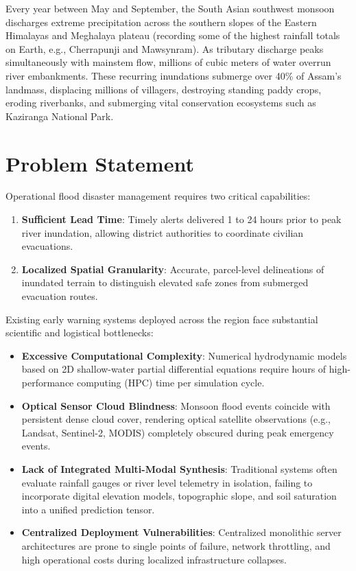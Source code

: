 \documentclass[12pt,a4paper,oneside]{report}
\begin{document}
Every year between May and September, the South Asian southwest monsoon discharges extreme precipitation across the southern slopes of the Eastern Himalayas and Meghalaya plateau (recording some of the highest rainfall totals on Earth, e.g., Cherrapunji and Mawsynram). As tributary discharge peaks simultaneously with mainstem flow, millions of cubic meters of water overrun river embankments. These recurring inundations submerge over 40\% of Assam's landmass, displacing millions of villagers, destroying standing paddy crops, eroding riverbanks, and submerging vital conservation ecosystems such as Kaziranga National Park.

\section{Problem Statement}
Operational flood disaster management requires two critical capabilities:
\begin{enumerate}
    \item \textbf{Sufficient Lead Time}: Timely alerts delivered 1 to 24 hours prior to peak river inundation, allowing district authorities to coordinate civilian evacuations.
    \item \textbf{Localized Spatial Granularity}: Accurate, parcel-level delineations of inundated terrain to distinguish elevated safe zones from submerged evacuation routes.
\end{enumerate}

Existing early warning systems deployed across the region face substantial scientific and logistical bottlenecks:
\begin{itemize}
    \item \textbf{Excessive Computational Complexity}: Numerical hydrodynamic models based on 2D shallow-water partial differential equations require hours of high-performance computing (HPC) time per simulation cycle.
    \item \textbf{Optical Sensor Cloud Blindness}: Monsoon flood events coincide with persistent dense cloud cover, rendering optical satellite observations (e.g., Landsat, Sentinel-2, MODIS) completely obscured during peak emergency events.
    \item \textbf{Lack of Integrated Multi-Modal Synthesis}: Traditional systems often evaluate rainfall gauges or river level telemetry in isolation, failing to incorporate digital elevation models, topographic slope, and soil saturation into a unified prediction tensor.
    \item \textbf{Centralized Deployment Vulnerabilities}: Centralized monolithic server architectures are prone to single points of failure, network throttling, and high operational costs during localized infrastructure collapses.
\end{itemize}
\end{document}
